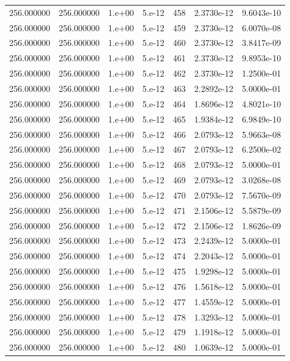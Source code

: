 \begin{table}[htbp]
\begin{tabular}{rrrrrrr}
256.000000 & 256.000000 & 1.e+00 & 5.e-12 & 458 & 2.3730e-12 & 9.6043e-10 \\
256.000000 & 256.000000 & 1.e+00 & 5.e-12 & 459 & 2.3730e-12 & 6.0070e-08 \\
256.000000 & 256.000000 & 1.e+00 & 5.e-12 & 460 & 2.3730e-12 & 3.8417e-09 \\
256.000000 & 256.000000 & 1.e+00 & 5.e-12 & 461 & 2.3730e-12 & 9.8953e-10 \\
256.000000 & 256.000000 & 1.e+00 & 5.e-12 & 462 & 2.3730e-12 & 1.2500e-01 \\
256.000000 & 256.000000 & 1.e+00 & 5.e-12 & 463 & 2.2892e-12 & 5.0000e-01 \\
256.000000 & 256.000000 & 1.e+00 & 5.e-12 & 464 & 1.8696e-12 & 4.8021e-10 \\
256.000000 & 256.000000 & 1.e+00 & 5.e-12 & 465 & 1.9384e-12 & 6.9849e-10 \\
256.000000 & 256.000000 & 1.e+00 & 5.e-12 & 466 & 2.0793e-12 & 5.9663e-08 \\
256.000000 & 256.000000 & 1.e+00 & 5.e-12 & 467 & 2.0793e-12 & 6.2500e-02 \\
256.000000 & 256.000000 & 1.e+00 & 5.e-12 & 468 & 2.0793e-12 & 5.0000e-01 \\
256.000000 & 256.000000 & 1.e+00 & 5.e-12 & 469 & 2.0793e-12 & 3.0268e-08 \\
256.000000 & 256.000000 & 1.e+00 & 5.e-12 & 470 & 2.0793e-12 & 7.5670e-09 \\
256.000000 & 256.000000 & 1.e+00 & 5.e-12 & 471 & 2.1506e-12 & 5.5879e-09 \\
256.000000 & 256.000000 & 1.e+00 & 5.e-12 & 472 & 2.1506e-12 & 1.8626e-09 \\
256.000000 & 256.000000 & 1.e+00 & 5.e-12 & 473 & 2.2439e-12 & 5.0000e-01 \\
256.000000 & 256.000000 & 1.e+00 & 5.e-12 & 474 & 2.2043e-12 & 5.0000e-01 \\
256.000000 & 256.000000 & 1.e+00 & 5.e-12 & 475 & 1.9298e-12 & 5.0000e-01 \\
256.000000 & 256.000000 & 1.e+00 & 5.e-12 & 476 & 1.5618e-12 & 5.0000e-01 \\
256.000000 & 256.000000 & 1.e+00 & 5.e-12 & 477 & 1.4559e-12 & 5.0000e-01 \\
256.000000 & 256.000000 & 1.e+00 & 5.e-12 & 478 & 1.3293e-12 & 5.0000e-01 \\
256.000000 & 256.000000 & 1.e+00 & 5.e-12 & 479 & 1.1918e-12 & 5.0000e-01 \\
256.000000 & 256.000000 & 1.e+00 & 5.e-12 & 480 & 1.0639e-12 & 5.0000e-01 \\

\end{tabular}
\end{table}
